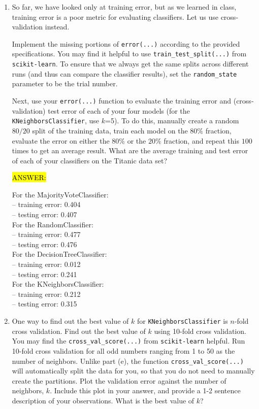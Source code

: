 \begin{enumerate}[resume]
\item {} So far, we have looked only at training error, but as we learned in class, training error is a poor metric for evaluating classifiers. Let us use cross-validation instead.

Implement the missing portions of \verb|error(...)| according to the provided specifications. You may find it helpful to use \verb|train_test_split(...)| from \verb|scikit-learn|. To ensure that we always get the same splits across different runs (and thus can compare the classifier results), set the \verb|random_state| parameter to be the trial number.

Next, use your \verb|error(...)| function to evaluate the training error and (cross-validation) test error of each of your four models (for the \verb|KNeighborsClassifier|, use $k$=5). To do this, manually create a random $80/20$ split of the training data, train each model on the $80\%$ fraction, evaluate the error on either the $80\%$ or the $20\%$ fraction, and repeat this $100$ times to get an average result. What are the average training and test error of each of your classifiers on the Titanic data set?

\hl{ANSWER:}
\begin{tabbing}
For the \=MajorityVoteClassifier: \\
        \> -- training error: 0.404 \\
        \>-- testing error: 0.407 \\
For the RandomClassifier: \\
        \>-- training error: 0.477 \\
        \>-- testing error: 0.476 \\
For the DecisionTreeClassifier: \\
        \>-- training error: 0.012 \\
        \>-- testing error: 0.241 \\
For the KNeighborsClassifier: \\
        \>-- training error: 0.212 \\
        \>-- testing error: 0.315 \\
\end{tabbing}

\item {} One way to find out the best value of $k$ for \verb|KNeighborsClassifier| is $n$-fold cross validation.
Find out the best value of $k$ using 10-fold cross validation. You may find the \verb|cross_val_score(...)| from \verb|scikit-learn| helpful. Run 10-fold cross validation for all odd numbers ranging from 1 to 50 as the number of neighbors. Unlike part (e), the function \verb|cross_val_score(...)| will automatically split the data for you, so that you do not need to manually create the partitions. 
Plot the validation error against the number of neighbors, $k$.
Include this plot in your answer, and provide a 1-2 sentence description of your observations. What is the best value of $k$?


\end{enumerate}
